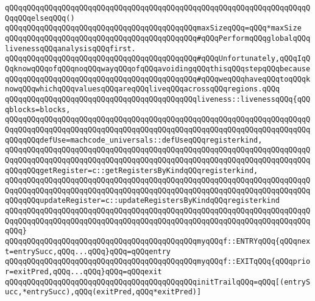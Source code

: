 \verb|qQQqqQQqqQQqqQQqqQQqqQQqqQQqqQQqqQQqqQQqqQQqqQQqqQQqqQQqqQQqqQQqqQQqqQQqqQQqelseqQQq()|\newline
\verb|qQQqqQQqqQQqqQQqqQQqqQQqqQQqqQQqqQQqqQQqqQQqmaxSizeqQQq=qQQq*maxSize|\newline
\newline
\verb|qQQqqQQqqQQqqQQqqQQqqQQqqQQqqQQqqQQqqQQqqQQq#qQQqPerformqQQqglobalqQQqlivenessqQQqanalysisqQQqfirst.|\newline
\verb|qQQqqQQqqQQqqQQqqQQqqQQqqQQqqQQqqQQqqQQqqQQq#qQQqUnfortunately,qQQqIqQQqknowqQQqofqQQqnoqQQqwayqQQqofqQQqavoidingqQQqthisqQQqstepqQQqbecause|\newline
\verb|qQQqqQQqqQQqqQQqqQQqqQQqqQQqqQQqqQQqqQQqqQQq#qQQqweqQQqhaveqQQqtoqQQqknowqQQqwhichqQQqvaluesqQQqareqQQqliveqQQqacrossqQQqregions.qQQq|\newline
\newline
\verb|qQQqqQQqqQQqqQQqqQQqqQQqqQQqqQQqqQQqqQQqqQQqliveness::livenessqQQq{qQQqblocks=blocks,|\newline
\verb|qQQqqQQqqQQqqQQqqQQqqQQqqQQqqQQqqQQqqQQqqQQqqQQqqQQqqQQqqQQqqQQqqQQqqQQqqQQqqQQqqQQqqQQqqQQqqQQqqQQqqQQqqQQqqQQqqQQqqQQqqQQqqQQqqQQqqQQqqQQqqQQqqQQqdefUse=machcode_universals::defUseqQQqregisterkind,|\newline
\verb|qQQqqQQqqQQqqQQqqQQqqQQqqQQqqQQqqQQqqQQqqQQqqQQqqQQqqQQqqQQqqQQqqQQqqQQqqQQqqQQqqQQqqQQqqQQqqQQqqQQqqQQqqQQqqQQqqQQqqQQqqQQqqQQqqQQqqQQqqQQqqQQqqQQqgetRegister=c::getRegistersByKindqQQqregisterkind,|\newline
\verb|qQQqqQQqqQQqqQQqqQQqqQQqqQQqqQQqqQQqqQQqqQQqqQQqqQQqqQQqqQQqqQQqqQQqqQQqqQQqqQQqqQQqqQQqqQQqqQQqqQQqqQQqqQQqqQQqqQQqqQQqqQQqqQQqqQQqqQQqqQQqqQQqqQQqupdateRegister=c::updateRegistersByKindqQQqregisterkind|\newline
\verb|qQQqqQQqqQQqqQQqqQQqqQQqqQQqqQQqqQQqqQQqqQQqqQQqqQQqqQQqqQQqqQQqqQQqqQQqqQQqqQQqqQQqqQQqqQQqqQQqqQQqqQQqqQQqqQQqqQQqqQQqqQQqqQQqqQQqqQQqqQQqqQQq}|\newline
\newline
\verb|qQQqqQQqqQQqqQQqqQQqqQQqqQQqqQQqqQQqqQQqqQQqmyqQQqf::ENTRYqQQq{qQQqnext=entrySucc,qQQq...qQQq}qQQq=qQQqentry|\newline
\verb|qQQqqQQqqQQqqQQqqQQqqQQqqQQqqQQqqQQqqQQqqQQqmyqQQqf::EXITqQQq{qQQqprior=exitPred,qQQq...qQQq}qQQq=qQQqexit|\newline
\verb|qQQqqQQqqQQqqQQqqQQqqQQqqQQqqQQqqQQqqQQqqQQqinitTrailqQQq=qQQq[(entrySucc,*entrySucc),qQQq(exitPred,qQQq*exitPred)]|\newline
\newline
